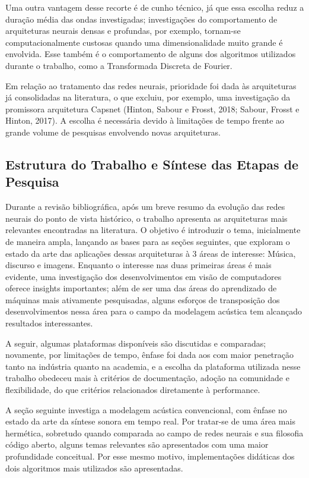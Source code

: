 \documentclass[]{article}
\begin{document}
Uma outra vantagem desse recorte é de cunho técnico, já que essa escolha
reduz a duração média das ondas investigadas; investigações do
comportamento de arquiteturas neurais densas e profundas, por exemplo,
tornam-se computacionalmente custosas quando uma dimensionalidade muito
grande é envolvida. Esse também é o comportamento de alguns dos
algoritmos utilizados durante o trabalho, como a Transformada Discreta
de Fourier.

Em relação ao tratamento das redes neurais, prioridade foi dada às
arquiteturas já consolidadas na literatura, o que excluiu, por exemplo,
uma investigação da promissora arquitetura Capsnet (Hinton, Sabour e
Frosst, 2018; Sabour, Frosst e Hinton, 2017). A escolha é necessária
devido à limitações de tempo frente ao grande volume de pesquisas
envolvendo novas arquiteturas.

\hypertarget{estrutura-do-trabalho-e-suxedntese-das-etapas-de-pesquisa}{%
\subsection{Estrutura do Trabalho e Síntese das Etapas de
Pesquisa}\label{estrutura-do-trabalho-e-suxedntese-das-etapas-de-pesquisa}}

Durante a revisão bibliográfica, após um breve resumo da evolução das
redes neurais do ponto de vista histórico, o trabalho apresenta as
arquiteturas mais relevantes encontradas na literatura. O objetivo é
introduzir o tema, inicialmente de maneira ampla, lançando as bases para
as seções seguintes, que exploram o estado da arte das aplicações dessas
arquiteturas à 3 áreas de interesse: Música, discurso e imagens.
Enquanto o interesse nas duas primeiras áreas é mais evidente, uma
investigação dos desenvolvimentos em visão de computadores oferece
insights importantes; além de ser uma das áreas do aprendizado de
máquinas mais ativamente pesquisadas, alguns esforços de transposição
dos desenvolvimentos nessa área para o campo da modelagem acústica tem
alcançado resultados interessantes.

A seguir, algumas plataformas disponíveis são discutidas e comparadas;
novamente, por limitações de tempo, ênfase foi dada aos com maior
penetração tanto na indústria quanto na academia, e a escolha da
plataforma utilizada nesse trabalho obedeceu mais à critérios de
documentação, adoção na comunidade e flexibilidade, do que critérios
relacionados diretamente à performance.

A seção seguinte investiga a modelagem acústica convencional, com ênfase
no estado da arte da síntese sonora em tempo real. Por tratar-se de uma
área mais hermética, sobretudo quando comparada ao campo de redes
neurais e sua filosofia código aberto, alguns temas relevantes são
apresentados com uma maior profundidade conceitual. Por esse mesmo
motivo, implementações didáticas dos dois algoritmos mais utilizados são
apresentadas.
\end{document}
